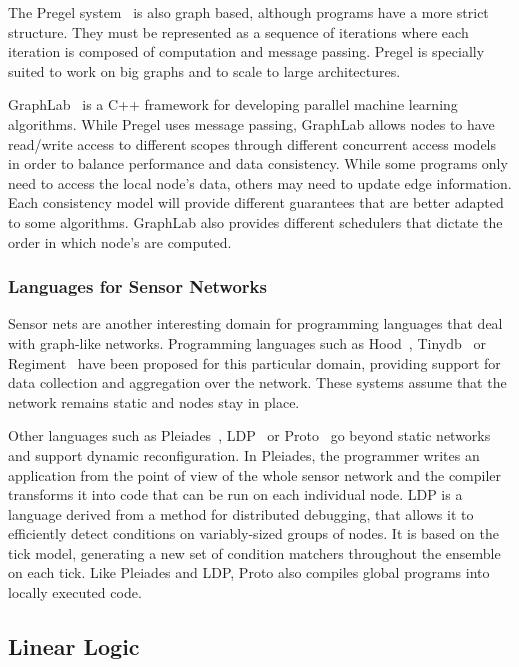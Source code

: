 The Pregel system~\cite{Malewicz:2010:PSL:1807167.1807184} is also graph based, although programs have a more strict
structure. They must be represented as a sequence of iterations where each iteration is composed of computation and message passing.
Pregel is specially suited to work on big graphs and to scale to large architectures.

GraphLab~\cite{GraphLab2010} is a C++ framework for developing parallel machine learning
algorithms. While Pregel uses message passing, GraphLab allows nodes to have read/write
access to different scopes through different concurrent access models in order to balance
performance and data consistency. While some programs only need to access the local node's
data, others may need to update edge information. Each consistency model will provide different
guarantees that are better adapted to some algorithms. GraphLab also provides different
schedulers that dictate the order in which node's are computed.

\subsubsection{Languages for Sensor Networks}

Sensor nets are another interesting domain for programming languages that deal with graph-like networks.
Programming languages such as Hood~\cite{Whitehouse:2004:HNA:990064.990079}, Tinydb~\cite{Madden:2005:TAQ:1061318.1061322}
or Regiment~\cite{Newton:2007:RMS:1236360.1236422} have been proposed for this particular domain, providing support for data collection and aggregation over the network.
These systems assume that the network remains static and nodes stay in place.

Other languages such as Pleiades~\cite{Kothari:2007:REP:1250734.1250757},
LDP~\cite{4543691} or Proto~\cite{Beal:2006:IEE:1137236.1137354} go beyond static networks and support dynamic reconfiguration. In Pleiades, the programmer writes
an application from the point of view of the whole sensor network and the compiler transforms it into code that can be run on each individual node.
LDP is a language derived from a method for distributed debugging, that allows it to efficiently detect conditions
on variably-sized groups of nodes. It is based on the tick model, generating a new set of condition matchers throughout the ensemble on each tick.
Like Pleiades and LDP, Proto also compiles global programs into locally executed code.

\subsection{Linear Logic}

